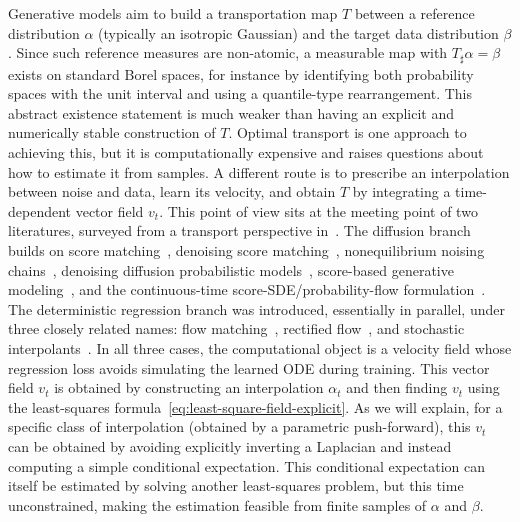 Generative models aim to build a transportation map $T$ between a reference distribution $\alpha$ (typically an isotropic Gaussian) and the target data distribution $\beta$. Since such reference measures are non-atomic, a measurable map with $T_\sharp\alpha=\beta$ exists on standard Borel spaces, for instance by identifying both probability spaces with the unit interval and using a quantile-type rearrangement. This abstract existence statement is much weaker than having an explicit and numerically stable construction of $T$.
%
Optimal transport is one approach to achieving this, but it is computationally expensive and raises questions about how to estimate it from samples. A different route is to prescribe an interpolation between noise and data, learn its velocity, and obtain $T$ by integrating a time-dependent vector field $v_t$. This point of view sits at the meeting point of two literatures, surveyed from a transport perspective in~\cite{Peyre2026OptimalDiffusionTransports}. The diffusion branch builds on score matching~\cite{Hyvarinen2005ScoreMatching}, denoising score matching~\cite{Vincent2011DenoisingScoreMatching}, nonequilibrium noising chains~\cite{SohlDickstein2015DeepUnsupervised}, denoising diffusion probabilistic models~\cite{Ho2020DDPM}, score-based generative modeling~\cite{Song2019ScoreMatchingGenerative}, and the continuous-time score-SDE/probability-flow formulation~\cite{Song2021ScoreSDE}. The deterministic regression branch was introduced, essentially in parallel, under three closely related names: flow matching~\cite{Lipman2022FlowMatching}, rectified flow~\cite{Liu2023RectifiedFlow}, and stochastic interpolants~\cite{Albergo2025StochasticInterpolants}. In all three cases, the computational object is a velocity field whose regression loss avoids simulating the learned ODE during training.
%
This vector field $v_t$ is obtained by constructing an interpolation $\alpha_t$ and then finding $v_t$ using the least-squares formula~\eqref{eq:least-square-field-explicit}. As we will explain, for a specific class of interpolation (obtained by a parametric push-forward), this $v_t$ can be obtained by avoiding explicitly inverting a Laplacian and instead computing a simple conditional expectation. This conditional expectation can itself be estimated by solving another least-squares problem, but this time unconstrained, making the estimation feasible from finite samples of $\alpha$ and $\beta$.

